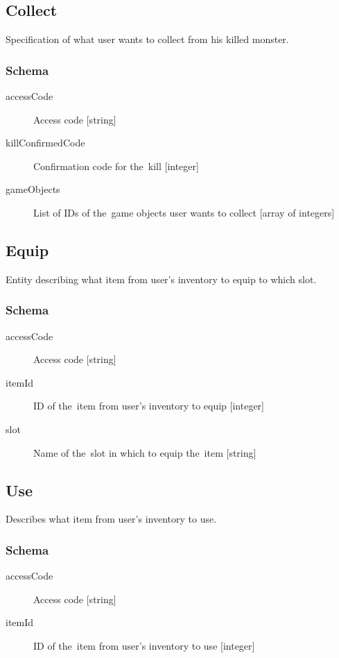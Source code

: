 	\subsection{Collect}
		\label{json:collect}
		Specification of what user wants to collect from his killed monster.
		\subsubsection{Schema}
			\begin{description}
				\item[accessCode] Access code [string]
				\item[killConfirmedCode] Confirmation code for the~kill [integer]
				\item[gameObjects] List of IDs of the~game objects user wants to collect [array of integers]
			\end{description}
	
	\subsection{Equip}
		\label{json:eqip}
		Entity describing what item from user's inventory to equip to which slot.
		\subsubsection{Schema}
			\begin{description}
				\item[accessCode] Access code [string]
				\item[itemId] ID of the~item from user's inventory to equip [integer]
				\item[slot] Name of the~slot in which to equip the~item [string]
			\end{description}

	\subsection{Use}
		\label{json:use}
		Describes what item from user's inventory to use.

		\subsubsection{Schema}
			\begin{description}
				\item[accessCode] Access code [string]
				\item[itemId] ID of the~item from user's inventory to use [integer]
			\end{description}
	
